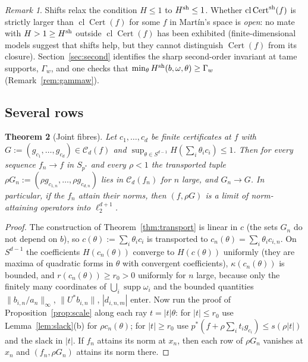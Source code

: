 \documentclass[10pt]{amsart}
\newtheorem{theorem}{Theorem}[section]
\theoremstyle{definition}
\theoremstyle{remark}
\newtheorem{remark}[theorem]{Remark}
\newcommand{\supp}{\operatorname{supp}}
\newcommand{\Cset}{\mathcal C}
\newcommand{\Cert}{\operatorname{Cert}}
\newcommand{\cl}{\operatorname{cl}}
\begin{document}
\begin{remark}\label{rem:shiftopen}
Shifts relax the condition $H\le1$ to $H^{\rm sh}\le1$.  Whether
$\cl\Cert^{\rm sh}(f)$ is strictly larger than $\cl\Cert(f)$ for some $f$ in
Mart\'in's space is \emph{open}: no mate with $H>1\ge H^{\rm sh}$ outside
$\cl\Cert(f)$ has been exhibited (finite-dimensional models suggest that
shifts help, but they cannot distinguish $\Cert(f)$ from its closure).
Section~\ref{sec:second} identifies the sharp second-order invariant at
tame supports, $\Gamma_w$, and one checks that $\min_\theta H^{\rm
sh}(b,\omega,\theta)\ge\Gamma_w$ (Remark~\ref{rem:gammaw}).
\end{remark}

\subsection{Several rows}

\begin{theorem}[Joint fibres]\label{thm:joint}
Let $c_1,\dots,c_d$ be finite certificates at $f$ with
$G:=(g_{c_1},\dots,g_{c_d})\in\Cset_d(f)$ and
$\sup_{\theta\in S^{d-1}}H(\sum_i\theta_ic_i)\le1$.  Then for every sequence
$f_n\to f$ in $S_{p^*}$ and every $\rho<1$ the transported tuple
$\rho G_n:=(\rho g_{c_{1,n}},\dots,\rho g_{c_{d,n}})$ lies in $\Cset_d(f_n)$
for $n$ large, and $G_n\to G$.  In particular, if the $f_n$ attain their
norms, then $(f,\rho G)$ is a limit of norm-attaining operators into
$\ell_2^{d+1}$.
\end{theorem}

\begin{proof}
The construction of Theorem~\ref{thm:transport} is linear in $c$ (the sets
$G_n$ do not depend on $b$), so $c(\theta):=\sum_i\theta_ic_i$ is
transported to $c_n(\theta)=\sum_i\theta_ic_{i,n}$.  On $S^{d-1}$ the
coefficients $H(c_n(\theta))$ converge to $H(c(\theta))$ uniformly (they
are maxima of quadratic forms in $\theta$ with convergent coefficients),
$\kappa(c_n(\theta))$ is bounded, and $r(c_n(\theta))\ge r_0>0$ uniformly
for $n$ large, because only the finitely many coordinates of
$\bigcup_i\supp\omega_i$ and the bounded quantities
$\|b_{i,n}/a_n\|_\infty$, $\|U^*b_{i,n}\|$, $|d_{i,n,m}|$ enter.  Now run
the proof of Proposition~\ref{prop:scale} along each ray $t=|t|\theta$:
for $|t|\le r_0$ use Lemma~\ref{lem:slack}(b) for $\rho c_n(\theta)$; for
$|t|\ge r_0$ use $p^*(f+\rho\sum_it_ig_{c_i})\le s(\rho|t|)$ and the slack
in $|t|$.  If $f_n$ attains its norm at $x_n$, then each row of $\rho G_n$
vanishes at $x_n$ and $(f_n,\rho G_n)$ attains its norm there.
\end{proof}
\end{document}
